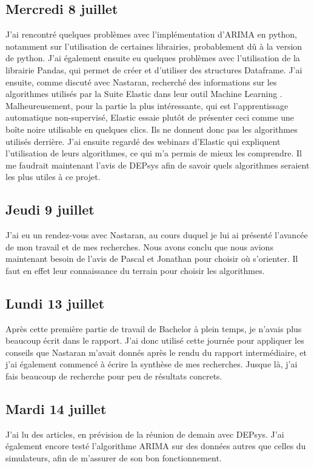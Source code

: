 \documentclass[paper=a4, fontsize=11pt]{scrartcl}
\begin{document}
\subsection{Mercredi 8 juillet}
    J'ai rencontré quelques problèmes avec l'implémentation d'ARIMA en python, notamment sur l'utilisation de certaines librairies, probablement dû à la version de python. J'ai également ensuite eu quelques problèmes avec l'utilisation de la librairie Pandas, qui permet de créer et d'utiliser des structures Dataframe. J'ai ensuite, comme discuté avec Nastaran, recherché des informations sur les algorithmes utilisés par la Suite Elastic dans leur outil \og Machine Learning \fg. Malheureusement, pour la partie la plus intéressante, qui est l'apprentissage automatique non-supervisé, Elastic essaie plutôt de présenter ceci comme une boîte noire utilisable en quelques clics. Ils ne donnent donc pas les algorithmes utilisés derrière. J'ai ensuite regardé des webinars d'Elastic qui expliquent l'utilisation de leurs algorithmes, ce qui m'a permis de mieux les comprendre. Il me faudrait maintenant l'avis de DEPsys afin de savoir quels algorithmes seraient les plus utiles à ce projet.
\subsection{Jeudi 9 juillet}
    J'ai eu un rendez-vous avec Nastaran, au cours duquel je lui ai présenté l'avancée de mon travail et de mes recherches. Nous avons conclu que nous avions maintenant besoin de l'avis de Pascal et Jonathan pour choisir où s'orienter. Il faut en effet leur connaissance du terrain pour choisir les algorithmes.
\subsection{Lundi 13 juillet}
    Après cette première partie de travail de Bachelor à plein temps, je n'avais plus beaucoup écrit dans le rapport. J'ai donc utilisé cette journée pour appliquer les conseils que Nastaran m'avait donnés après le rendu du rapport intermédiaire, et j'ai également commencé à écrire la synthèse de mes recherches. Jusque là, j'ai fais beaucoup de recherche pour peu de résultats concrets.
\subsection{Mardi 14 juillet}
    J'ai lu des articles, en prévision de la réunion de demain avec DEPsys. J'ai également encore testé l'algorithme ARIMA sur des données autres que celles du simulateurs, afin de m'assurer de son bon fonctionnement.
\end{document}
